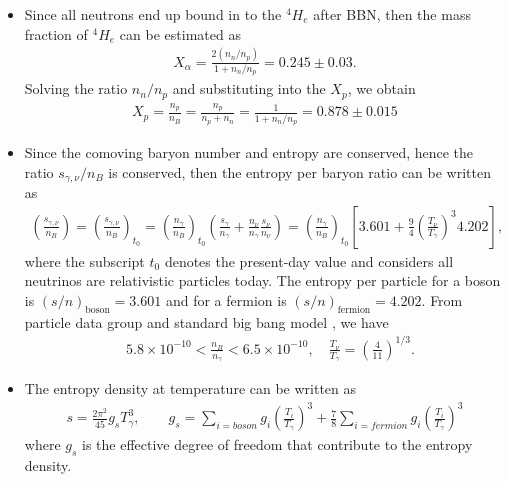\documentclass[Universe,article,submit,moreauthors,pdftex]{Definitions/mdpi}
\begin{document}
\begin{itemize}
  \item Since all neutrons end up bound in to the $^4H_e$ after BBN, then the mass fraction of $^4H_e$ can be estimated as \cite{ParticleDataGroup:2022pth}
\begin{align}
X_\alpha=\frac{2(n_n/n_p)}{1+n_n/n_p}=0.245\pm0.03.
\end{align} 
 Solving the ratio $n_n/n_p$ and substituting into the $X_p$, we obtain
\begin{align}
 X_p=\frac{n_p}{n_B}=\frac{n_p}{n_p+n_n}=\frac{1}{1+n_n/n_p}=0.878\pm0.015
\end{align}

  \item Since the comoving baryon number and entropy are conserved, hence the ratio $s_{\gamma,\nu}/n_B$ is conserved, then the entropy per baryon ratio can be written as
\begin{align}
\left(\frac{s_{\gamma,\nu}}{n_B}\right)=\left(\frac{s_{\gamma,\nu}}{n_B}\right)_{\!\!t_0}\!\!=\left(\frac{n_\gamma}{n_B}\right)_{\!\!t_0}\left(\frac{s_\gamma}{n_\gamma}+\frac{n_\nu}{n_\gamma}\frac{s_\nu}{n_\nu}\right)=\left(\frac{n_\gamma}{n_B}\right)_{\!\!t_0}\left[3.601+\frac{9}{4}\left(\frac{T_\nu}{T_\gamma}\right)^{\!\!3}4.202\right],
\end{align}
where the subscript $t_0$ denotes the present-day value and considers all neutrinos are relativistic particles today. The entropy per particle for a boson is $(s/n)_\mathrm{boson}=3.601$ and for a fermion is $(s/n)_\mathrm{fermion}=4.202$. From particle data group and standard big bang model \cite{ParticleDataGroup:2022pth,Kolb:1990vq}, we have
\begin{align}
&5.8\times10^{-10}<\frac{n_B}{n_\gamma}<6.5\times10^{-10},\quad\frac{T_\nu}{T_\gamma}=\left(\frac{4}{11}\right)^{1/3}.
\end{align}

  \item The entropy density at temperature can be written as \cite{Kolb:1990vq}
\begin{align}
s=\frac{2\pi^2}{45}g_sT_\gamma^3,\qquad g_s=\sum_{i=boson}g_i\left(\frac{T_i}{T_\gamma}\right)^3+\frac{7}{8}\sum_{i=fermion}g_i\left(\frac{T_i}{T_\gamma}\right)^3
\end{align}
where $g_s$ is the effective degree of freedom that contribute to the entropy density.  
\end{itemize}
 
\end{document}

